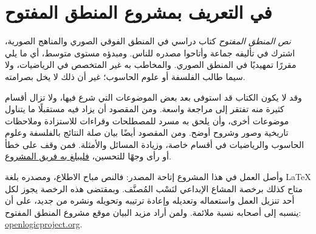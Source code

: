 \chapter*{في التعريف بمشروع المنطق المفتوح}

\textit{نص المنطق المفتوح} كتاب دراسي في المنطق الفوقي الصوري والمناهج
الصورية، اشترك في تأليفه جماعة وأتاحوا مصدره للناس. ومبدؤه مستوى متوسط،
أي ما يلي مقررًا تمهيديًا في المنطق الصوري. والمخاطب به غير المتخصص في
الرياضيات، ولا سيما طالب الفلسفة أو علوم الحاسوب؛ غير أن ذلك لا يخل بصرامته.

وقد لا يكون الكتاب قد استوفى بعد بعض الموضوعات التي شرع فيها، ولا تزال أقسام كثيرة
منه تفتقر إلى مراجعة واسعة. ومن المقصود أن يزاد فيه مستقبلًا ما يتناول
موضوعات أخرى، وأن يلحق به مسرد للمصطلحات وقراءات للاستزادة وملاحظات
تاريخية وصور وشروح أوضح. ومن المقصود أيضًا بيان صلة النتائج بالفلسفة
وعلوم الحاسوب والرياضيات في أقسام خاصة، وزيادة المسائل والأمثلة. فمن وقف
على خطأ أو رأى وجهًا للتحسين،
\href{https://github.com/OpenLogicProject/OpenLogic/wiki/Contributing}{فليبلغ به فريق المشروع}.

وأصل العمل في هذا المشروع إتاحة المصدر: فالنص مباح الاطلاع، ومصدره بلغة
LaTeX متاح كذلك برخصة المشاع الإبداعي لنَسْب المُصنَّف. وبمقتضى هذه الرخصة
يجوز لكل أحد تنزيل العمل واستعماله وتعديله وإعادة ترتيبه وتحويله ونشره
من جديد، على أن ينسبه إلى أصحابه نسبة ملائمة. ولمن أراد مزيد البيان
موقع مشروع المنطق المفتوح:
\href{http://openlogicproject.org/}{openlogicproject.org}.
